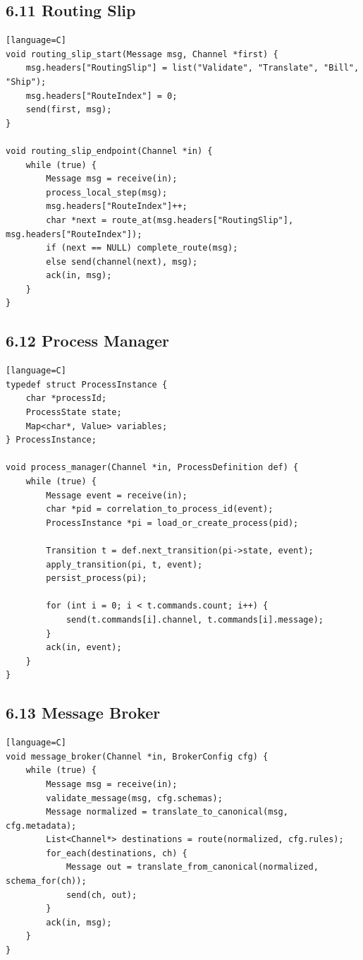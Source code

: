 \documentclass[11pt]{article}
\begin{document}
\subsection{6.11 Routing Slip}\label{routing-slip}

\begin{verbatim}[language=C]
void routing_slip_start(Message msg, Channel *first) {
    msg.headers["RoutingSlip"] = list("Validate", "Translate", "Bill", "Ship");
    msg.headers["RouteIndex"] = 0;
    send(first, msg);
}

void routing_slip_endpoint(Channel *in) {
    while (true) {
        Message msg = receive(in);
        process_local_step(msg);
        msg.headers["RouteIndex"]++;
        char *next = route_at(msg.headers["RoutingSlip"], msg.headers["RouteIndex"]);
        if (next == NULL) complete_route(msg);
        else send(channel(next), msg);
        ack(in, msg);
    }
}
\end{verbatim}

\subsection{6.12 Process Manager}\label{process-manager}

\begin{verbatim}[language=C]
typedef struct ProcessInstance {
    char *processId;
    ProcessState state;
    Map<char*, Value> variables;
} ProcessInstance;

void process_manager(Channel *in, ProcessDefinition def) {
    while (true) {
        Message event = receive(in);
        char *pid = correlation_to_process_id(event);
        ProcessInstance *pi = load_or_create_process(pid);

        Transition t = def.next_transition(pi->state, event);
        apply_transition(pi, t, event);
        persist_process(pi);

        for (int i = 0; i < t.commands.count; i++) {
            send(t.commands[i].channel, t.commands[i].message);
        }
        ack(in, event);
    }
}
\end{verbatim}

\subsection{6.13 Message Broker}\label{message-broker}

\begin{verbatim}[language=C]
void message_broker(Channel *in, BrokerConfig cfg) {
    while (true) {
        Message msg = receive(in);
        validate_message(msg, cfg.schemas);
        Message normalized = translate_to_canonical(msg, cfg.metadata);
        List<Channel*> destinations = route(normalized, cfg.rules);
        for_each(destinations, ch) {
            Message out = translate_from_canonical(normalized, schema_for(ch));
            send(ch, out);
        }
        ack(in, msg);
    }
}
\end{verbatim}
\end{document}
